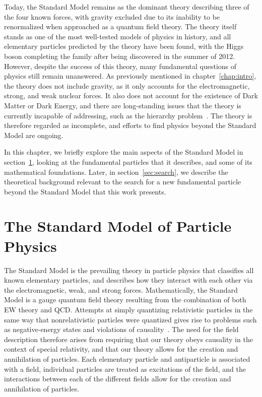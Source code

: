 Today, the Standard Model remains as the dominant theory describing three of the four known forces, with gravity excluded due to its inability to be renormalized when approached as a quantum field theory.
The theory itself stands as one of the most well-tested models of physics in history, and all elementary particles predicted by the theory have been found, with the Higgs boson completing the family after being discovered in the summer of 2012.
However, despite the success of this theory, many fundamental questions of physics still remain unanswered.
As previously mentioned in chapter~\ref{chap:intro}, the theory does not include gravity, as it only accounts for the electromagnetic, strong, and weak nuclear forces.
It also does not account for the existence of Dark Matter or Dark Energy, and there are long-standing issues that the theory is currently incapable of addressing, such as the hierarchy problem~\cite{krippendorf2010cambridge}.
The theory is therefore regarded as incomplete, and efforts to find physics beyond the Standard Model are ongoing.

In this chapter, we briefly explore the main aspects of the Standard Model in section~\ref{sec:SM}, looking at the fundamental particles that it describes, and some of its mathematical foundations.
Later, in section~\ref{sec:search}, we describe the theoretical background relevant to the search for a new fundamental particle beyond the Standard Model that this work presents.

\section{The Standard Model of Particle Physics}
\label{sec:SM}

The Standard Model is the prevailing theory in particle physics that classifies all known elementary particles, and describes how they interact with each other via the electromagnetic, weak, and strong forces.
Mathematically, the Standard Model is a gauge quantum field theory resulting from the combination of both EW theory and QCD.
Attempts at simply quantizing relativistic particles in the same way that nonrelativistic particles were quantized gives rise to problems such as negative-energy states and violations of causality~\cite{Peskin:257493}.
The need for the field description therefore arises from requiring that our theory obeys causality in the context of special relativity, and that our theory allows for the creation and annihilation of particles.
Each elementary particle and antiparticle is associated with a field, individual particles are treated as excitations of the field, and the interactions between each of the different fields allow for the creation and annihilation of particles.


